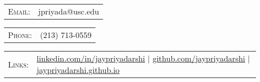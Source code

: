 \begin{tabular}{rl}
\textsc{Email:} & jpriyada@usc.edu\\
\end{tabular}
\hfill
\begin{tabular}{rl}
\textsc{\hspace{2.0cm}Phone:} & (213) 713-0559\\
\end{tabular}
\hfill

%
\begin{tabular}{rl}
\textsc{Links:} & \href{http://linkedin.com/in/jaypriyadarshi}{linkedin.com/in/jaypriyadarshi} \hspace{.5cm}|\hspace{.5cm} \href{http://github.com/jaypriyadarshi}{github.com/jaypriyadarshi}
\hspace{.5cm}|\hspace{.5cm} \href{https://jaypriyadarshi.github.io/}{jaypriyadarshi.github.io}
\end{tabular}
\vspace{5pt}

